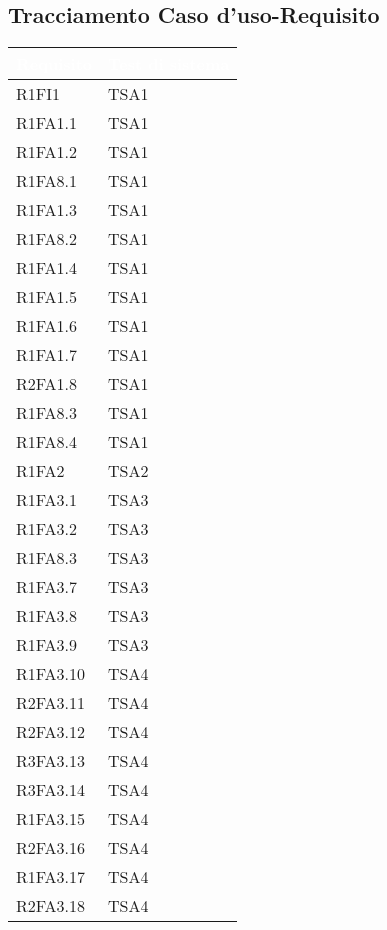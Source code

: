 \subsection{Tracciamento Caso d'uso-Requisito}
{
\renewcommand{\arraystretch}{1.5}
\centering
\begin{longtable}{C{4cm} C{4cm}}
\textcolor{white}{\textbf{Requisito}} & \textcolor{white}{\textbf{Test di sistema}}\\	
\endhead

R1FI1 & TSA1  \\
R1FA1.1 & TSA1  \\
R1FA1.2 & TSA1  \\
R1FA8.1 & TSA1  \\
R1FA1.3 & TSA1  \\
R1FA8.2 & TSA1  \\
R1FA1.4 & TSA1  \\
R1FA1.5 & TSA1  \\
R1FA1.6 & TSA1  \\
R1FA1.7 & TSA1  \\
R2FA1.8 & TSA1  \\
R1FA8.3 & TSA1  \\
R1FA8.4 & TSA1  \\

R1FA2 & TSA2  \\

R1FA3.1 & TSA3  \\
R1FA3.2 & TSA3  \\
R1FA8.3 & TSA3  \\
R1FA3.7 & TSA3  \\
R1FA3.8 & TSA3  \\
R1FA3.9 & TSA3  \\

R1FA3.10 & TSA4  \\
R2FA3.11 & TSA4  \\
R2FA3.12 & TSA4  \\
R3FA3.13 & TSA4  \\
R3FA3.14 & TSA4  \\
R1FA3.15 & TSA4  \\
R2FA3.16 & TSA4  \\
R1FA3.17 & TSA4  \\
R2FA3.18 & TSA4  \\


\end{longtable}}
